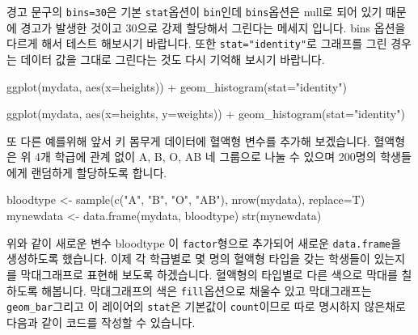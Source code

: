 \documentclass[
]{book}
\newenvironment{Shaded}{\begin{snugshade}}{\end{snugshade}}
\newcommand{\AttributeTok}[1]{\textcolor[rgb]{0.77,0.63,0.00}{#1}}
\newcommand{\FunctionTok}[1]{\textcolor[rgb]{0.00,0.00,0.00}{#1}}
\newcommand{\NormalTok}[1]{#1}
\newcommand{\OtherTok}[1]{\textcolor[rgb]{0.56,0.35,0.01}{#1}}
\newcommand{\SpecialCharTok}[1]{\textcolor[rgb]{0.00,0.00,0.00}{#1}}
\newcommand{\StringTok}[1]{\textcolor[rgb]{0.31,0.60,0.02}{#1}}
\begin{document}
경고 문구의 \texttt{bins=30}은 기본 \texttt{stat}옵션이 \texttt{bin}인데 \texttt{bins}옵션은 null로 되어 있기 때문에 경고가 발생한 것이고 30으로 강제 할당해서 그린다는 메세지 입니다. bins 옵션을 다르게 해서 테스트 해보시기 바랍니다. 또한 \texttt{stat="identity"}로 그래프를 그린 경우는 데이터 값을 그대로 그린다는 것도 다시 기억해 보시기 바랍니다.

\begin{Shaded}
\begin{Highlighting}[]
\FunctionTok{ggplot}\NormalTok{(mydata, }\FunctionTok{aes}\NormalTok{(}\AttributeTok{x=}\NormalTok{heights)) }\SpecialCharTok{+}
  \FunctionTok{geom\_histogram}\NormalTok{(}\AttributeTok{stat=}\StringTok{"identity"}\NormalTok{)}

\FunctionTok{ggplot}\NormalTok{(mydata, }\FunctionTok{aes}\NormalTok{(}\AttributeTok{x=}\NormalTok{heights, }\AttributeTok{y=}\NormalTok{weights)) }\SpecialCharTok{+}
  \FunctionTok{geom\_histogram}\NormalTok{(}\AttributeTok{stat=}\StringTok{"identity"}\NormalTok{)}
\end{Highlighting}
\end{Shaded}

또 다른 예를위해 앞서 키 몸무게 데이터에 혈액형 변수를 추가해 보겠습니다. 혈액형은 위 4개 학급에 관계 없이 A, B, O, AB 네 그룹으로 나눌 수 있으며 200명의 학생들에게 랜덤하게 할당하도록 합니다.

\begin{Shaded}
\begin{Highlighting}[]
\NormalTok{bloodtype }\OtherTok{\textless{}{-}} \FunctionTok{sample}\NormalTok{(}\FunctionTok{c}\NormalTok{(}\StringTok{"A"}\NormalTok{, }\StringTok{"B"}\NormalTok{, }\StringTok{"O"}\NormalTok{, }\StringTok{"AB"}\NormalTok{), }\FunctionTok{nrow}\NormalTok{(mydata), }\AttributeTok{replace=}\NormalTok{T)}
\NormalTok{mynewdata }\OtherTok{\textless{}{-}} \FunctionTok{data.frame}\NormalTok{(mydata, bloodtype)}
\FunctionTok{str}\NormalTok{(mynewdata)}
\end{Highlighting}
\end{Shaded}

위와 같이 새로운 변수 bloodtype 이 \texttt{factor}형으로 추가되어 새로운 \texttt{data.frame}을 생성하도록 했습니다. 이제 각 학급별로 몇 명의 혈액형 타입을 갖는 학생들이 있는지를 막대그래프로 표현해 보도록 하겠습니다. 혈액형의 타입별로 다른 색으로 막대를 칠하도록 해봅니다. 막대그래프의 색은 \texttt{fill}옵션으로 채울수 있고 막대그래프는 \texttt{geom\_bar}그리고 이 레이어의 \texttt{stat}은 기본값이 \texttt{count}이므로 따로 명시하지 않은채로 다음과 같이 코드를 작성할 수 있습니다.
\end{document}
